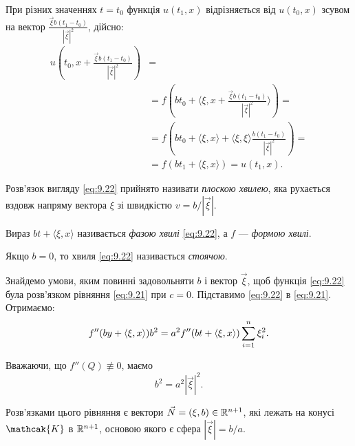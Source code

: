 При різних значеннях $t = t_0$ функція $u(t_1, x)$ відрізняється від $u(t_0, x)$ зсувом на вектор $\frac{\vec \xi b (t_1 - t_0)}{|\vec \xi|^2}$, дійсно:
\begin{equation}
    \begin{aligned}
        u \left(t_0, x + \frac{\vec \xi b (t_1 - t_0)}{|\vec \xi|^2} \right) &= \\
        &= f \left(b t_0 + \langle \xi, x + \frac{\vec \xi b (t_1 - t_0)}{|\vec \xi|^2} \rangle \right) = \\
        &= f \left( b t_0 + \langle \xi, x\rangle + \langle \xi, \xi \rangle \frac{b (t_1 - t_0)}{|\vec \xi|^2} \right) = \\
        &= f (b t_1 + \langle \xi, x\rangle) = u(t_1, x).
    \end{aligned}
\end{equation}

\begin{definition}
    Розв'язок вигляду \eqref{eq:9.22} прийнято називати \textit{плоскою хвилею}, яка рухається вздовж напряму вектора $\xi$ зі швидкістю $v = b / |\vec \xi|$.    
\end{definition}

\begin{definition}
    Вираз $b t + \langle \xi, x \rangle$ називається \textit{фазою хвилі} \eqref{eq:9.22}, а $f$ --- \textit{формою хвилі}. 
\end{definition}

\begin{definition}
    Якщо $b = 0$, то хвиля \eqref{eq:9.22} називається \textit{стоячою}.
\end{definition}

Знайдемо умови, яким повинні задовольняти $b$ і вектор $\vec \xi$, щоб функція \eqref{eq:9.22} була розв'язком рівняння \eqref{eq:9.21} при $c = 0$. Підставимо \eqref{eq:9.22} в \eqref{eq:9.21}. Отримаємо: 
\begin{equation}
    f'' (b y + \langle \xi, x \rangle) b^2 = a^2 f''(b t + \langle \xi, x \rangle) \Sum_{i = 1}^n \xi_i^2.
\end{equation}

Вважаючи, що $f''(Q) \not\equiv 0$, маємо
\begin{equation}
    \label{eq:9.23}
    b^2 = a^2 \left| \vec \xi \right|^2.
\end{equation}

Розв'язками цього рівняння є вектори $\vec N = (\xi, b) \in \mathbb{R}^{n + 1}$, які лежать на конусі $\mathcak{K}$ в $\mathbb{R}^{n + 1}$, основою якого є сфера $\left| \vec \xi \right| = b / a$. 

